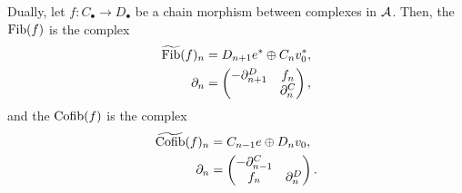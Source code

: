 {Dually, let $f\colon C_{\bullet}\to D_{\bullet}$ 
be a chain morphism between complexes in ${\cal A}$. 
Then, the  $\mathrm{Fib}(f)$ 
is the complex 
\begin{align*}
\widetilde{\mathrm{Fib}}(f)_n &= 
D_{n+1}e^{\ast}\oplus C_nv_0^{\ast}, \\
\partial_n &= 
\begin{pmatrix}
-\partial^D_{n+1} & f_n \\
 & \partial^C_n
\end{pmatrix},
\end{align*}
and the  $\mathrm{Cofib}(f)$ 
is the complex 
\begin{align*}
\widetilde{\mathrm{Cofib}}(f)_n &= 
C_{n-1}e\oplus D_nv_0, \\
\partial_n &= 
\begin{pmatrix}
-\partial^C_{n-1} & \\
f_n & \partial^D_n
\end{pmatrix}.
\end{align*}
}

